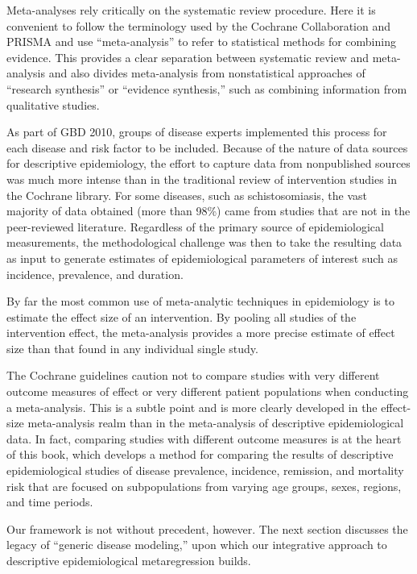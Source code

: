 Meta-analyses rely critically on the systematic review procedure. Here
it is convenient to follow the terminology used by the Cochrane
Collaboration and PRISMA and use ``meta-analysis'' to refer to
statistical methods for combining evidence.  This provides a clear
separation between systematic review and meta-analysis and also divides
meta-analysis from nonstatistical approaches of ``research
synthesis'' or ``evidence synthesis,'' such as combining information
from qualitative studies.

As part of GBD 2010, groups of disease experts implemented
this process for each disease and risk factor to be
included. Because of the nature of data sources for descriptive
epidemiology, the effort to capture data from nonpublished sources
was much more intense than in the traditional review of
intervention studies in the Cochrane library.  For some diseases, such
as schistosomiasis, the vast majority of data obtained (more than
98\%) came from studies that are not in the peer-reviewed literature.
Regardless of the primary source of epidemiological measurements, the
methodological challenge was then to take the resulting data as input
to generate estimates of epidemiological parameters of interest such
as incidence, prevalence, and duration.

By far the most common use of meta-analytic techniques in epidemiology is to estimate
the effect size of an intervention.  By pooling all studies of the
intervention effect, the meta-analysis provides a more precise
estimate of effect size than that found in any individual single
study.

The Cochrane guidelines caution not to compare studies with very
different outcome measures of effect or very different patient
populations when conducting a
meta-analysis.\cite{_cochrane_2012} This is a subtle point
and is more clearly developed in the effect-size meta-analysis realm
than in the meta-analysis of descriptive epidemiological data.  In
fact, comparing studies with different outcome measures is at the
heart of this book, which develops a method for comparing the results
of descriptive epidemiological studies of disease prevalence,
incidence, remission, and mortality risk that are focused on
subpopulations from varying age groups, sexes, regions, and time
periods.

Our framework is not without precedent, however.  The next section discusses the
legacy of ``generic disease modeling,'' upon which our integrative approach
to descriptive epidemiological metaregression builds.



